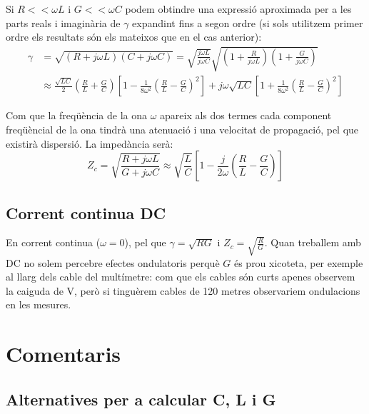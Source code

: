 Si $R << \omega L$ i $G << \omega C $ podem obtindre una expressió aproximada per a les parts reals i imaginària de $\gamma$ expandint fins a segon ordre (si sols utilitzem primer ordre els resultats són els mateixos que en el cas anterior):
\begin{subequations}
  \begin{align}
   \gamma &= \sqrt{(R + j\omega L)(C + j\omega C)} = \sqrt{\frac{j\omega L }{j\omega C}}  \sqrt{\left ( 1 +  \frac{R}{j\omega L} \right) \left ( 1 + \frac{G}{j\omega C } \right )}  \\
   &\approx \frac{\sqrt{LC}}{2} \left ( \frac{R}{L} + \frac{G}{C} \right ) \left [ 1 - \frac{1}{8 \omega ^2} \left ( \frac{R}{L} - \frac{G}{C} \right ) ^2 \right ] + j \omega \sqrt{LC} \left [ 1 +  \frac{1}{8 \omega^2} \left ( \frac{R}{L} - \frac{G}{C} \right) ^2 \right ] \nonumber
  \end{align}
 
\end{subequations}

Com que la freqüència de la ona $\omega$ apareix als dos termes cada component freqüèncial de la ona tindrà una atenuació i una velocitat de propagació, pel que existirà dispersió. La impedància serà:
\begin{equation}
  Z_c = \sqrt{\frac{R + j \omega L}{G + j\omega C}} \approx \sqrt{\frac{L}{C}} \left [ 1 - \frac{j}{2 \omega } \left ( \frac{R}{L} - \frac{G}{C} \right) \right ]
\end{equation}

\subsection{Corrent continua DC}

En corrent continua  ($\omega = 0$), pel que  $\gamma = \sqrt{RG}$ i $Z_c = \sqrt{\frac{R}{G}}$. Quan treballem amb DC no solem percebre efectes ondulatoris perquè $G$ és prou xicoteta, per exemple al llarg dels cable del multímetre: com que els cables són curts apenes observem la caiguda de V, però si tinguèrem cables de 120 metres observariem ondulacions en les mesures.

\section{Comentaris}

\subsection{Alternatives per a calcular C, L i G}

